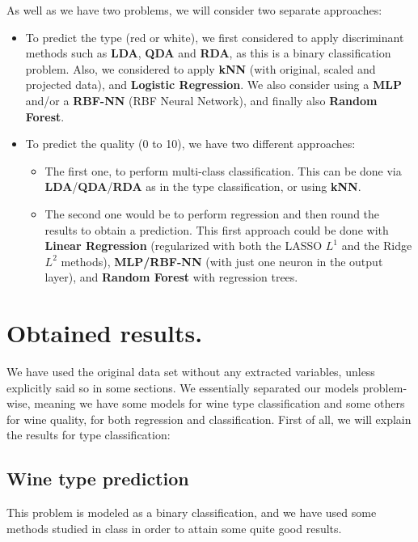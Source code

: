 \documentclass[10pt]{article}
\begin{document}
As well as we have two problems, we will consider two separate approaches:
\begin{itemize}
	\item To predict the type (red or white), we first considered to apply discriminant methods such as \textbf{LDA}, \textbf{QDA} and \textbf{RDA}, as this is a binary classification problem. Also, we considered to apply \textbf{kNN} (with original, scaled and projected data), and \textbf{Logistic Regression}. We also consider using a \textbf{MLP} and/or a \textbf{RBF-NN} (RBF Neural Network), and finally also \textbf{Random Forest}.
	\item To predict the quality (0 to 10), we have two different approaches: 
	\begin{itemize}
		\item The first one, to perform multi-class classification. This can be done via \textbf{LDA}/\textbf{QDA}/\textbf{RDA} as in the type classification, or using \textbf{kNN}.
		\item The second one would be to perform regression and then round the results to obtain a prediction. This first approach could be done with \textbf{Linear Regression} (regularized with both the LASSO $L^1$ and the Ridge $L^2$ methods), \textbf{MLP/RBF-NN} (with just one neuron in the output layer), and \textbf{Random Forest} with regression trees.
		
	\end{itemize}		
\end{itemize}

\section{Obtained results.}
We have used the original data set without any extracted variables, unless explicitly said so in some sections. We essentially separated our models problem-wise, meaning we have some models for wine type classification and some others for wine quality, for both regression and classification. First of all, we will explain the results for type classification:
\subsection{Wine type prediction}
This problem is modeled as a binary classification, and we have used some methods studied in class in order to attain some quite good results.\\
\end{document}

